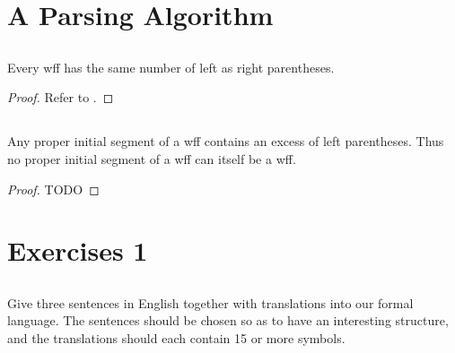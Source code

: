 \documentclass{report}
\begin{document}
\section{A Parsing Algorithm}%

\subsection{}%

  \begin{lemma}[13A]
    Every wff has the same number of left as right parentheses.
  \end{lemma}

  \begin{proof}
    Refer to .
  \end{proof}

\subsection{}%

  \begin{lemma}[13B]
    Any proper initial segment of a wff contains an excess of left parentheses.
    Thus no proper initial segment of a wff can itself be a wff.
  \end{lemma}

  \begin{proof}
    TODO
  \end{proof}

\section{Exercises 1}%

\subsection{}%

  Give three sentences in English together with translations into our formal
    language.
  The sentences should be chosen so as to have an interesting structure, and the
    translations should each contain 15 or more symbols.
\end{document}
